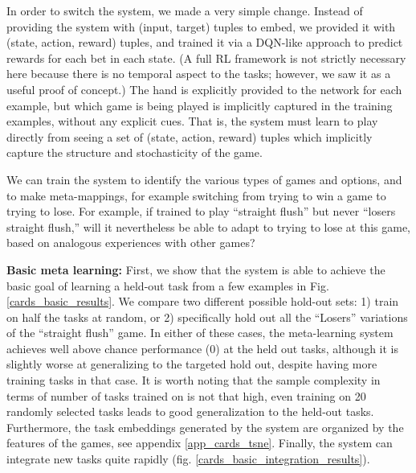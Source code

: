 \documentclass{article}
\begin{document}
In order to switch the system, we made a very simple change. Instead of providing the system with (input, target) tuples to embed, we provided it with (state, action, reward) tuples, and trained it via a DQN-like approach \citep{Mnih2015} to predict rewards for each bet in each state. (A full RL framework is not strictly necessary here because there is no temporal aspect to the tasks; however, we saw it as a useful proof of concept.) The hand is explicitly provided to the network for each example, but which game is being played is implicitly captured in the training examples, without any explicit cues. That is, the system must learn to play directly from seeing a set of (state, action, reward) tuples which implicitly capture the structure and stochasticity of the game. \par   
We can train the system to identify the various types of games and options, and to make meta-mappings, for example switching from trying to win a game to trying to lose. For example, if trained to play ``straight flush'' but never ``losers straight flush,'' will it nevertheless be able to adapt to trying to lose at this game, based on analogous experiences with other games? \par
\textbf{Basic meta learning:} First, we show that the system is able to achieve the basic goal of learning a held-out task from a few examples in Fig. \ref{cards_basic_results}. We compare two different possible hold-out sets: 1) train on half the tasks at random, or 2) specifically hold out all the ``Losers'' variations of the ``straight flush'' game. In either of these cases, the meta-learning system achieves well above chance performance (0) at the held out tasks, although it is slightly worse at generalizing to the targeted hold out, despite having more training tasks in that case. It is worth noting that the sample complexity in terms of number of tasks trained on is not that high, even training on 20 randomly selected tasks leads to good generalization to the held-out tasks. Furthermore, the task embeddings generated by the system are organized by the features of the games, see appendix \ref{app_cards_tsne}. Finally, the system can integrate new tasks quite rapidly (fig. \ref{cards_basic_integration_results}).\par
\end{document}
